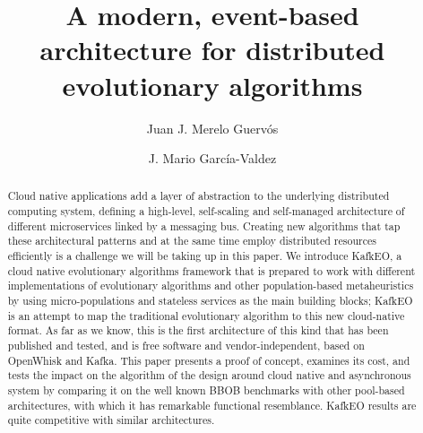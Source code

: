 \documentclass{llncs}
\begin{document}
\sloppy

\title{A modern, event-based architecture for distributed evolutionary algorithms}

\author{Juan J. Merelo Guerv\'os \and J. Mario Garc\'ia-Valdez}

%

%
\tocauthor{ }
%




\maketitle

\begin{abstract}

Cloud native applications add a layer of abstraction to the
underlying distributed computing system, defining a high-level,
self-scaling and self-managed architecture of different microservices
linked by a messaging bus. Creating new algorithms that tap these
architectural patterns and at the same time employ distributed
resources efficiently is a challenge we will be taking up in this
paper. We introduce KafkEO, a cloud native evolutionary algorithms
framework that is prepared to work with different implementations of evolutionary
algorithms and other population-based metaheuristics by using
micro-populations and stateless services as the main building
blocks; KafkEO is an attempt to map the traditional evolutionary
algorithm to this new cloud-native format. As far as we know, this is the first
architecture of this kind that has been published and tested, and is free 
software and vendor-independent, based on OpenWhisk and Kafka. 
This paper presents a proof of concept, examines its cost, and tests 
the impact on the algorithm of the design around
cloud native and asynchronous system by comparing it on
the well known BBOB benchmarks with other pool-based architectures,
with which it has remarkable functional resemblance. KafkEO results are 
quite competitive with similar architectures.


\end{abstract}
\end{document}
